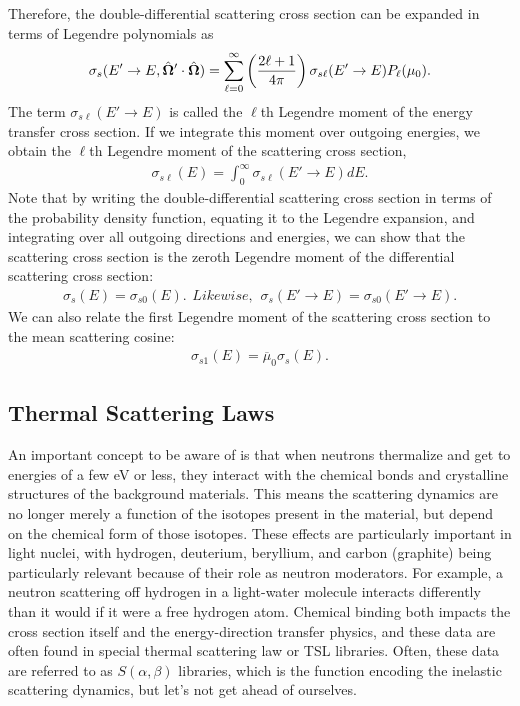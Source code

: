 Therefore, the double-differential scattering cross section can be expanded in terms of Legendre polynomials as
\begin{align}
  \sigma_s(E' \rightarrow E, \hat{\mathbf{\Omega}}' \cdot \hat{\mathbf{\Omega}}) = \sum_{\ell = 0}^\infty \left( \frac{2\ell + 1}{4\pi} \right) \sigma_{s\ell}(E' \rightarrow E) P_\ell(\mu_0) .
\end{align}
The term $\sigma_{s\ell}(E' \rightarrow E)$ is called the $\ell$th Legendre moment of the energy transfer cross section. If we integrate this moment over outgoing energies, we obtain the $\ell$th Legendre moment of the scattering cross section,
\begin{align}
  \sigma_{s\ell}(E) = \int_0^\infty \sigma_{s\ell}(E' \rightarrow E) dE.
\end{align}
Note that by writing the double-differential scattering cross section in terms of the probability density function, equating it to the Legendre expansion, and integrating over all outgoing directions and energies, we can show that the scattering cross section is the zeroth Legendre moment of the differential scattering cross section:
\begin{subequations}
\begin{align}
  \sigma_s(E) = \sigma_{s0}(E) .
\end{align}
Likewise,
\begin{align}
  \sigma_s(E' \rightarrow E) = \sigma_{s0}(E' \rightarrow E) .
\end{align}
\end{subequations}
We can also relate the first Legendre moment of the scattering cross section to the mean scattering cosine:
\begin{align}
  \sigma_{s1}(E) = \overline{\mu}_0 \sigma_s(E) .
\end{align}

\subsection{Thermal Scattering Laws}

An important concept to be aware of is that when neutrons thermalize and get to energies of a few eV or less, they interact with the chemical bonds and crystalline structures of the background materials. This means the scattering dynamics are no longer merely a function of the isotopes present in the material, but depend on the chemical form of those isotopes. These effects are particularly important in light nuclei, with hydrogen, deuterium, beryllium, and carbon (graphite) being particularly relevant because of their role as neutron moderators. For example, a neutron scattering off hydrogen in a light-water molecule interacts differently than it would if it were a free hydrogen atom. Chemical binding both impacts the cross section itself and the energy-direction transfer physics, and these data are often found in special thermal scattering law or TSL libraries. Often, these data are referred to as $S(\alpha,\beta)$ libraries, which is the function encoding the inelastic scattering dynamics, but let's not get ahead of ourselves.

